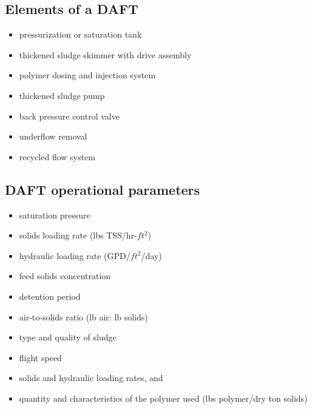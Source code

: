 \subsection{Elements of a DAFT}

\begin{itemize}
\item pressurization or saturation tank 
\item thickened sludge skimmer with drive assembly
\item polymer dosing and injection system
\item thickened sludge pump
\item back pressure control valve
\item underflow removal
\item recycled flow system
\end{itemize}

\subsection{DAFT operational parameters}

\begin{itemize}
\item saturation pressure
\item solids loading rate (lbs TSS/hr-$ft^2$)
\item hydraulic loading rate (GPD/$ft^2$/day)
\item feed solids concentration
\item detention period
\item air-to-solids ratio (lb air: lb solids)
\item type and quality of sludge
\item flight speed
\item solids and hydraulic loading rates, and
\item quantity and characteristics of the polymer used (lbs polymer/dry ton solids)
\end{itemize}


\newpage
